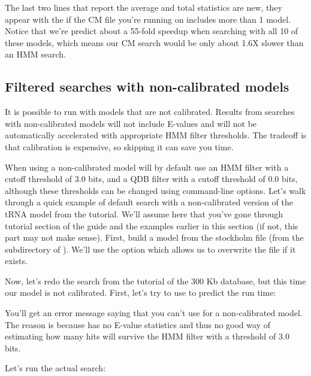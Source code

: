 The last two lines that report the average and total statistics are
new, they appear with the  if the
CM file you're running   on includes more than 1 model. 
Notice that we're predict about a 55-fold speedup when searching with
all 10 of these models, which means our CM search would be only about
1.6X slower than an HMM search.

\subsection{Filtered searches with non-calibrated models}

It is possible to run  with models that are not
calibrated. Results from searches with non-calibrated models will not
include E-values and will not be automatically accelerated with
appropriate HMM filter thresholds. The tradeoff is that calibration is
expensive, so skipping it can save you time.  

When using a non-calibrated model  will by default use
an HMM filter with a cutoff threshold of $3.0$ bits, and a QDB filter
with a cutoff threshold of $0.0$ bits, although these thresholds can
be changed using command-line options. Let's walk through a quick
example of default search with a non-calibrated version of the tRNA model
from the tutorial. We'll assume here that you've gone through tutorial
section of the guide and the examples earlier in this section (if not,
this part may not make sense).  First, build a model from the
 stockholm file (from the 
subdirectory of ). We'll use the  option
which allows us to overwrite the file  if it exists.


Now, let's redo the search from the tutorial of the 300 Kb database,
but this time our model is not calibrated. First, let's try to use
 to predict the run time: 


You'll get an error message saying that you can't use
 for a non-calibrated model. The reason is because
 has no E-value statistics and thus no good way of
estimating how many hits will survive the HMM filter with a threshold
of $3.0$ bits. 

Let's run the actual search:


